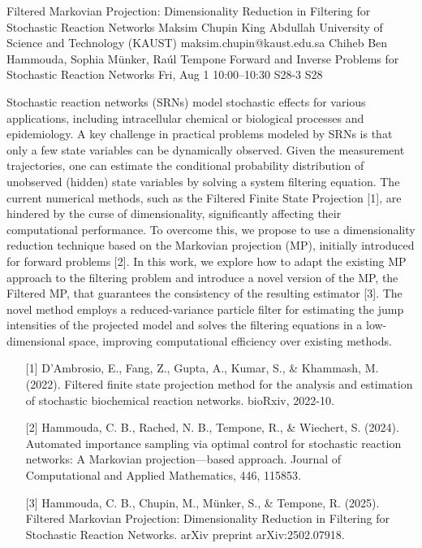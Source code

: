 \begin{talk}
  {Filtered Markovian Projection: Dimensionality Reduction in Filtering for Stochastic Reaction Networks}%
  {Maksim Chupin}%
  {King Abdullah University of Science and Technology (KAUST)}%
  {maksim.chupin@kaust.edu.sa}%
  {Chiheb Ben Hammouda, Sophia M\"{u}nker, Ra\'{u}l Tempone}%
  {Forward and Inverse Problems for Stochastic Reaction Networks}%
  {Fri, Aug 1 10:00–10:30}%
  {S28-3}%
  {S28}%
				
			
Stochastic reaction networks (SRNs) model stochastic effects for various applications, including intracellular chemical or biological processes and epidemiology. A key challenge in practical problems modeled by SRNs is that only a few state variables can be dynamically observed. Given the measurement trajectories, one can estimate the conditional probability distribution of unobserved (hidden) state variables by solving a system filtering equation. The current numerical methods, such as the Filtered Finite State Projection [1], are hindered by the curse of dimensionality, significantly affecting their computational performance. To overcome this, we propose to use a dimensionality reduction technique based on the Markovian projection (MP), initially introduced for forward problems [2]. In this work, we explore how to adapt the existing MP approach to the filtering problem and introduce a novel version of the MP, the Filtered MP, that guarantees the consistency of the resulting estimator [3]. The novel method employs a reduced-variance particle filter for estimating the jump intensities of the projected model and solves the filtering equations in a low-dimensional space, improving computational efficiency over existing methods.





\medskip

\begin{enumerate}
	\item[{[1]}] D’Ambrosio, E., Fang, Z., Gupta, A., Kumar, S., \& Khammash, M. (2022). Filtered finite state projection method for the analysis and estimation of stochastic biochemical reaction networks. bioRxiv, 2022-10.
	\item[{[2]}] Hammouda, C. B., Rached, N. B., Tempone, R., \& Wiechert, S. (2024). Automated importance sampling via optimal control for stochastic reaction networks: A Markovian projection---based approach. Journal of Computational and Applied Mathematics, 446, 115853.
    \item [{[3]}] Hammouda, C. B., Chupin, M., Münker, S., \& Tempone, R. (2025). Filtered Markovian Projection: Dimensionality Reduction in Filtering for Stochastic Reaction Networks. arXiv preprint arXiv:2502.07918.
\end{enumerate}


\end{talk}

